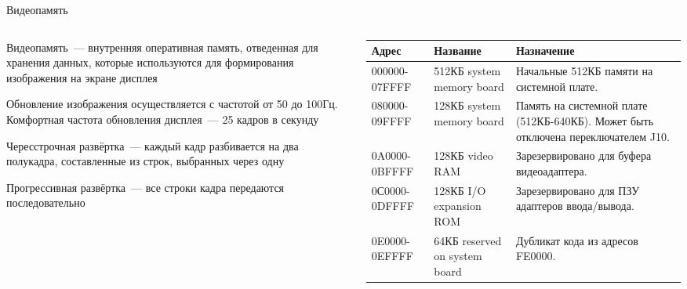 \documentclass[aspectratio=169,14pt]{beamer}
\begin{document}
\begin{frame}{Видеопамять}
    \begin{columns}
        \begin{column}{0.5\textwidth}
            \begin{itemize}
                \begin{footnotesize}
                \begin{spacing}{0.9}
                \item Видеопамять~--- внутренняя оперативная память,
                отведенная для хранения данных, которые используются
                для формирования изображения на экране дисплея
                \item Обновление изображения осуществляется с
                частотой от 50 до 100Гц. Комфортная частота
                обновления дисплея~--- 25 кадров в секунду
                \item Чересстрочная развёртка~--- каждый кадр
                разбивается на два полукадра, составленные из строк,
                выбранных через одну
                \item Прогрессивная развёртка~--- все строки кадра
                передаются последовательно
                \end{spacing}
            \end{footnotesize}
            \end{itemize}
        \end{column}
        \begin{column}{0.5\textwidth}
            \begin{tiny}
                \begin{tabular}{|p{0.8cm}|p{2cm}|p{3cm}|}
                    \hline
                    \textbf{Адрес} & \textbf{Название} & \textbf{Назначение} \\ \hline
                    000000-07FFFF & 512КБ system memory board & Начальные 512КБ памяти на системной плате. \\ \hline
                    080000-09FFFF & 128КБ system memory board & Память на системной плате (512КБ-640КБ). Может быть отключена переключателем J10. \\ \hline
                    0A0000-0BFFFF & 128КБ video RAM & Зарезервировано для буфера видеоадаптера. \\ \hline
                    0С0000-0DFFFF & 128КБ I/O expansion ROM & Зарезервировано для ПЗУ адаптеров ввода/вывода. \\ \hline
                    0E0000-0EFFFF & 64КБ reserved on system board & Дубликат кода из адресов FE0000. \\ \hline

\end{tabular}
\end{tiny}
\end{column}
\end{columns}
\end{frame}
\end{document}
